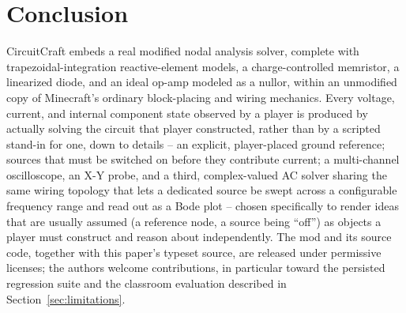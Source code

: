 \section{Conclusion}
\label{sec:conclusion}

CircuitCraft embeds a real modified nodal analysis solver, complete with
trapezoidal-integration reactive-element models, a charge-controlled memristor, a linearized
diode, and an ideal op-amp modeled as a nullor, within an unmodified copy of Minecraft's
ordinary block-placing and wiring mechanics. Every voltage, current, and internal component
state observed by a player is produced by actually solving the circuit that player
constructed, rather than by a scripted stand-in for one, down to details -- an explicit,
player-placed ground reference; sources that must be switched on before they contribute
current; a multi-channel oscilloscope, an X-Y probe, and a third, complex-valued AC solver
sharing the same wiring topology that lets a dedicated source be swept across a configurable
frequency range and read out as a Bode plot -- chosen specifically to render ideas that are
usually assumed (a reference node, a source being ``off'') as objects a player must construct
and reason about independently. The mod and its source code, together with this paper's
typeset source, are released under permissive licenses; the authors welcome contributions,
in particular toward the persisted regression suite and the classroom evaluation described in
Section~\ref{sec:limitations}.
